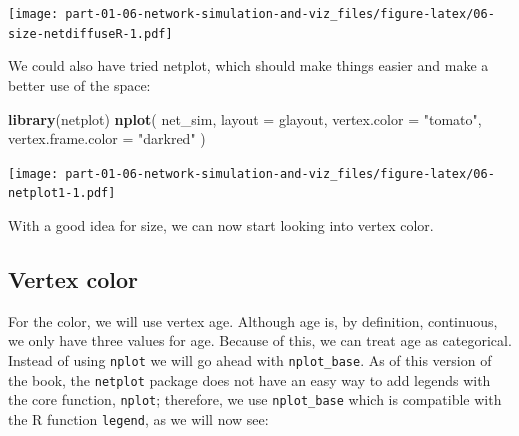 \documentclass[]{book}
\newenvironment{Shaded}{\begin{snugshade}}{\end{snugshade}}
\newcommand{\CommentTok}[1]{\textcolor[rgb]{0.56,0.35,0.01}{\textit{#1}}}
\newcommand{\DataTypeTok}[1]{\textcolor[rgb]{0.13,0.29,0.53}{#1}}
\newcommand{\DecValTok}[1]{\textcolor[rgb]{0.00,0.00,0.81}{#1}}
\newcommand{\FloatTok}[1]{\textcolor[rgb]{0.00,0.00,0.81}{#1}}
\newcommand{\KeywordTok}[1]{\textcolor[rgb]{0.13,0.29,0.53}{\textbf{#1}}}
\newcommand{\NormalTok}[1]{#1}
\newcommand{\OperatorTok}[1]{\textcolor[rgb]{0.81,0.36,0.00}{\textbf{#1}}}
\newcommand{\OtherTok}[1]{\textcolor[rgb]{0.56,0.35,0.01}{#1}}
\newcommand{\StringTok}[1]{\textcolor[rgb]{0.31,0.60,0.02}{#1}}
\begin{document}
\begin{Shaded}
\end{Shaded}

\texttt{[image: part-01-06-network-simulation-and-viz\_files/figure-latex/06-size-netdiffuseR-1.pdf]}

We could also have tried netplot, which should make things easier and make a better use of the space:

\begin{Shaded}
\begin{Highlighting}[]
\KeywordTok{library}\NormalTok{(netplot)}
\KeywordTok{nplot}\NormalTok{(}
\NormalTok{  net_sim, }\DataTypeTok{layout =}\NormalTok{ glayout,}
  \DataTypeTok{vertex.color =} \StringTok{"tomato"}\NormalTok{,}
  \DataTypeTok{vertex.frame.color =} \StringTok{"darkred"}
\NormalTok{  )}
\end{Highlighting}
\end{Shaded}

\texttt{[image: part-01-06-network-simulation-and-viz\_files/figure-latex/06-netplot1-1.pdf]}

With a good idea for size, we can now start looking into vertex color.

\hypertarget{vertex-color}{%
\subsection{Vertex color}\label{vertex-color}}

For the color, we will use vertex age. Although age is, by definition, continuous,
we only have three values for age. Because of this, we can treat age as categorical.
Instead of using \texttt{nplot} we will go ahead with \texttt{nplot\_base}. As of this version of
the book, the \texttt{netplot} package does not have an easy way to add legends with the
core function, \texttt{nplot}; therefore, we use \texttt{nplot\_base} which is compatible with
the R function \texttt{legend}, as we will now see:
\end{document}
